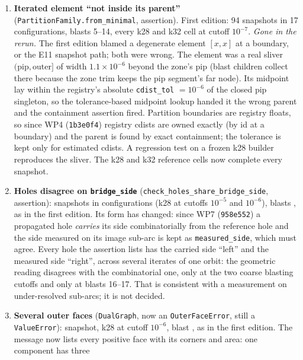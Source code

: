 \documentclass[11pt,a4paper]{article}
\newcommand{\code}[1]{\texttt{#1}}
\begin{document}
\begin{enumerate}[leftmargin=*]
\item \textbf{Iterated element ``not inside its parent''}
  (\code{PartitionFamily.\allowbreak from\_\allowbreak minimal}, assertion).
  First edition: 94 snapshots in 17 configurations, blasts 5--14, every k28
  and k32 cell at cutoff $10^{-7}$. \emph{Gone in the rerun.} The first
  edition blamed a degenerate element $[x,x]$ at a boundary, or the E11
  snapshot path; both were wrong. The element was a real sliver
  $(\text{pip},\text{outer}]$ of width $1.1\times10^{-6}$ beyond the zone's
  pip (blast children collect there because the zone trim keeps the pip
  segment's far node). Its midpoint lay within the registry's absolute
  \code{cdist\_tol} $=10^{-6}$ of the closed pip singleton, so the
  tolerance-based midpoint lookup handed it the wrong parent and the
  containment assertion fired. Partition boundaries are registry floats, so
  since WP4 (\code{1b3e0f4}) registry cdists are owned exactly (by id at a
  boundary) and the parent is found by exact containment; the tolerance is
  kept only for estimated cdists. A regression test on a frozen k28 builder
  reproduces the sliver. The k28 and k32 reference cells now complete every
  snapshot.
\item \textbf{Holes disagree on \code{bridge\_side}}
  (\code{check\_holes\_\allowbreak share\_\allowbreak bridge\_side}, assertion):
  \NumDeepErrHoleSideSnapshots{} snapshots in
  \NumDeepErrHoleSideConfigs{} configurations (k28 at cutoffs $10^{-5}$ and
  $10^{-6}$), blasts \NumDeepErrHoleSideBlasts, as in the first edition. Its
  form has changed: since WP7 (\code{958e552}) a propagated hole
  \emph{carries} its side combinatorially from the reference hole and the
  side measured on its image sub-arc is kept as \code{measured\_side}, which
  must agree. Every hole the assertion lists has the carried side ``left''
  and the measured side ``right'', across several iterates of one orbit:
  the geometric reading disagrees with the combinatorial one, only at the
  two coarse blasting cutoffs and only at blasts 16--17. That is consistent
  with a measurement on under-resolved sub-arcs; it is not decided.
\item \textbf{Several outer faces} (\code{DualGraph}, now an
  \code{OuterFaceError}, still a \code{ValueError}):
  \NumDeepErrOuterFacesSnapshots{} snapshot, k28 at cutoff $10^{-6}$, blast
  \NumDeepErrOuterFacesBlasts, as in the first edition. The message now lists
  every positive face with its corners and area: one component has three

\end{enumerate}
\end{document}
